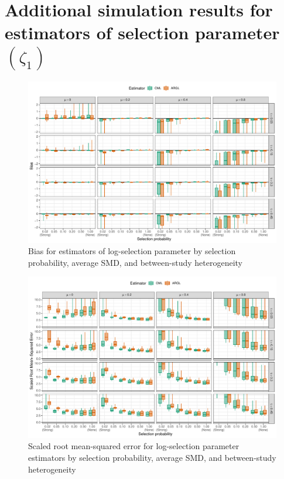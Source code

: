 \documentclass[
  man, donotrepeattitle,floatsintext]{apa7}
\begin{document}
\section{\texorpdfstring{Additional simulation results for estimators of selection parameter \((\zeta_1)\)}{Additional simulation results for estimators of selection parameter (\textbackslash zeta\_1)}}\label{zeta-simulation-results}

\begin{figure}
\includegraphics{selection_models_draft_files/figure-latex/selection-bias-1} \caption{Bias for estimators of log-selection parameter by selection probability, average SMD, and between-study heterogeneity}\label{fig:selection-bias}
\end{figure}

\begin{figure}
\includegraphics{selection_models_draft_files/figure-latex/selection-rmse-1} \caption{Scaled root mean-squared error for log-selection parameter estimators by selection probability, average SMD, and between-study heterogeneity}\label{fig:selection-rmse}
\end{figure}
\end{document}
